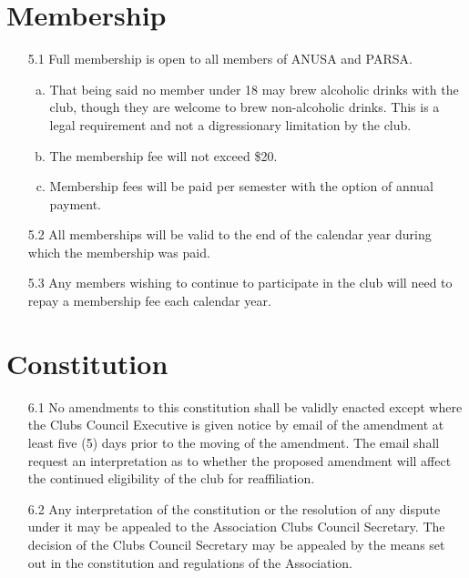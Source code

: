 \documentclass{article}
\begin{document}
\section{Membership}

\begin{enumerate}
    \item[5.1] Full membership is open to all members of ANUSA and PARSA.
    \begin{enumerate}[a.]
        \item That being said no member under 18 may brew alcoholic drinks with the club, though they are welcome to brew non-alcoholic drinks. This is a legal requirement and not a digressionary limitation by the club.
        \item The membership fee will not exceed \$20.
        \item Membership fees will be paid per semester with the option of annual payment.
    \end{enumerate}
    \item[5.2] All memberships will be valid to the end of the calendar year during which the membership was paid.
    \item[5.3] Any members wishing to continue to participate in the club will need to repay a membership fee each calendar year.
\end{enumerate}

\section{Constitution}
\begin{enumerate}
    \item[6.1] No amendments to this constitution shall be validly enacted except where the Clubs Council Executive is given notice by email of the amendment at least five (5) days prior to the moving of the amendment. The email shall request an interpretation as to whether the proposed amendment will affect the continued eligibility of the club for reaffiliation.
    \item[6.2] Any interpretation of the constitution or the resolution of any dispute under it may be appealed to the Association Clubs Council Secretary. The decision of the Clubs Council Secretary may be appealed by the means set out in the constitution and regulations of the Association.
\end{enumerate}
\end{document}
